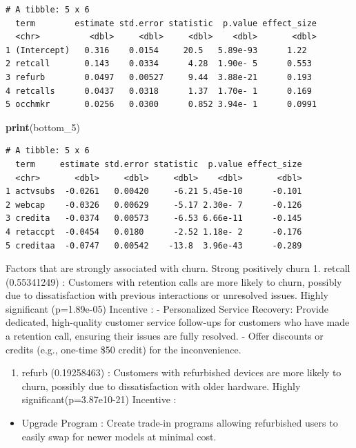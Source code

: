 \documentclass[
]{article}
\newenvironment{Shaded}{\begin{snugshade}}{\end{snugshade}}
\newcommand{\FunctionTok}[1]{\textcolor[rgb]{0.13,0.29,0.53}{\textbf{#1}}}
\newcommand{\NormalTok}[1]{#1}
\providecommand{\tightlist}{%
  \setlength{\itemsep}{0pt}\setlength{\parskip}{0pt}}
\begin{document}
\begin{verbatim}
# A tibble: 5 x 6
  term        estimate std.error statistic  p.value effect_size
  <chr>          <dbl>     <dbl>     <dbl>    <dbl>       <dbl>
1 (Intercept)   0.316    0.0154     20.5   5.89e-93      1.22  
2 retcall       0.143    0.0334      4.28  1.90e- 5      0.553 
3 refurb        0.0497   0.00527     9.44  3.88e-21      0.193 
4 retcalls      0.0437   0.0318      1.37  1.70e- 1      0.169 
5 occhmkr       0.0256   0.0300      0.852 3.94e- 1      0.0991
\end{verbatim}

\begin{Shaded}
\begin{Highlighting}[]
\FunctionTok{print}\NormalTok{(bottom\_5)}
\end{Highlighting}
\end{Shaded}

\begin{verbatim}
# A tibble: 5 x 6
  term     estimate std.error statistic  p.value effect_size
  <chr>       <dbl>     <dbl>     <dbl>    <dbl>       <dbl>
1 actvsubs  -0.0261   0.00420     -6.21 5.45e-10      -0.101
2 webcap    -0.0326   0.00629     -5.17 2.30e- 7      -0.126
3 credita   -0.0374   0.00573     -6.53 6.66e-11      -0.145
4 retaccpt  -0.0454   0.0180      -2.52 1.18e- 2      -0.176
5 creditaa  -0.0747   0.00542    -13.8  3.96e-43      -0.289
\end{verbatim}

Factors that are strongly associated with churn. Strong positively churn
1. retcall (0.55341249) : Customers with retention calls are more likely
to churn, possibly due to dissatisfaction with previous interactions or
unresolved issues. Highly significant (p=1.89e-05) Incentive : -
Personalized Service Recovery: Provide dedicated, high-quality customer
service follow-ups for customers who have made a retention call,
ensuring their issues are fully resolved. - Offer discounts or credits
(e.g., one-time \$50 credit) for the inconvenience.

\begin{enumerate}
\def\labelenumi{\arabic{enumi}.}
\setcounter{enumi}{1}
\tightlist
\item
  refurb (0.19258463) : Customers with refurbished devices are more
  likely to churn, possibly due to dissatisfaction with older hardware.
  Highly significant(p=3.87e10-21) Incentive :
\end{enumerate}

\begin{itemize}
\tightlist
\item
  Upgrade Program : Create trade-in programs allowing refurbished users
  to easily swap for newer models at minimal cost.
\end{itemize}
\end{document}
